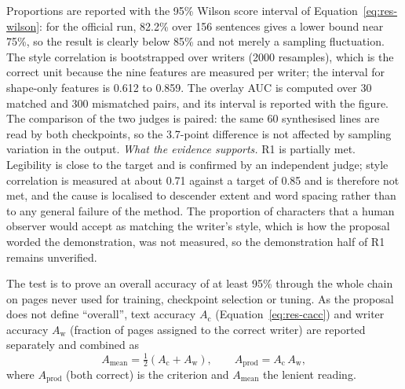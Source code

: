 
            Proportions are reported with the 95\% Wilson score interval of Equation~\ref{eq:res-wilson}: for the official run, 82.2\% over 156 sentences gives a lower bound near 75\%, so the result is clearly below 85\% and not merely a sampling fluctuation.
            The style correlation is bootstrapped over writers (2000 resamples), which is the correct unit because the nine features are measured per writer; the interval for shape-only features is 0.612 to 0.859.
            The overlay AUC is computed over 30 matched and 300 mismatched pairs, and its interval is reported with the figure.
            The comparison of the two judges is paired: the same 60 synthesised lines are read by both checkpoints, so the 3.7-point difference is not affected by sampling variation in the output.
            \emph{What the evidence supports.}
            R1 is partially met. Legibility is close to the target and is confirmed by an independent judge; style correlation is measured at about 0.71 against a target of 0.85 and is therefore not met, and the cause is localised to descender extent and word spacing rather than to any general failure of the method.
            The proportion of characters that a human observer would accept as matching the writer's style, which is how the proposal worded the demonstration, was not measured, so the demonstration half of R1 remains unverified.




\medskip
\label{sec:res-qtp2}


            The test is to prove an overall accuracy of at least 95\% through the whole chain on pages never used for training, checkpoint selection or tuning.
            As the proposal does not define ``overall'', text accuracy $A_{\mathrm{c}}$ (Equation~\ref{eq:res-cacc}) and writer accuracy $A_{\mathrm{w}}$ (fraction of pages assigned to the correct writer) are reported separately and combined as
            \begin{equation}
            \label{eq:res-overall}
            A_{\mathrm{mean}}=\tfrac{1}{2}\left(A_{\mathrm{c}}+A_{\mathrm{w}}\right),\qquad A_{\mathrm{prod}}=A_{\mathrm{c}}\,A_{\mathrm{w}},
            \end{equation}
            where $A_{\mathrm{prod}}$ (both correct) is the criterion and $A_{\mathrm{mean}}$ the lenient reading.

